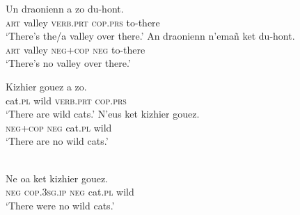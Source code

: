 \documentclass[output=paper,colorlinks,citecolor=brown]{langscibook}
\begin{document}
\begin{exe}\ex\label{ex:ieur-breton-valley}
\begin{xlist}
\ex\gll Un draonienn a zo du-hont. \\
\textsc{art} valley \textsc{verb.prt} \textsc{cop.prs} to-there \\
    \glt `There's the/a valley over there.' 
\ex\gll An draonienn n’emañ ket du-hont.\\
\textsc{art} valley \textsc{neg+cop} \textsc{neg} to-there\\
\glt `There's no valley over there.' 
\end{xlist}
%
\ex\label{ex:ieur-breton-wildcats}
\begin{xlist}
\ex\gll Kizhier gouez a zo. \\
cat.\textsc{pl} wild \textsc{verb.prt} \textsc{cop.prs} \\
    \glt `There are wild cats.'
\ex\gll N’eus ket kizhier gouez. \\
    \textsc{neg+cop} \textsc{neg} cat.\textsc{pl}   wild \\
    \glt `There are no wild cats.'
\end{xlist}
%
\ex\label{ex:ieur-breton-nowildcatspast}
\\
    \gll Ne oa ket kizhier gouez. \\
\textsc{neg} \textsc{cop.3sg.ip} \textsc{neg} cat.\textsc{pl} wild \\
    \glt `There were no wild cats.'
\end{exe}
\end{document}
